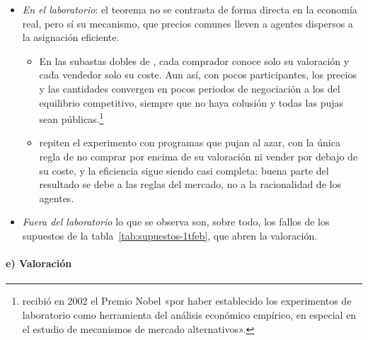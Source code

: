 \documentclass[11pt]{article}
\begin{document}
\begin{itemize}
\item \emph{En el laboratorio}: el teorema no se contrasta de forma directa en la economía real, pero sí su mecanismo, que precios comunes lleven a agentes dispersos a la asignación eficiente.
  \begin{itemize}
  \item En las subastas dobles de \textcite{Smith1962Experimental}, cada comprador conoce solo su valoración y cada vendedor solo su coste. Aun así, con pocos participantes, los precios y las cantidades convergen en pocos periodos de negociación a los del equilibrio competitivo, siempre que no haya colusión y todas las pujas sean públicas\nocite{Smith1962Experimental}.\footnote{ recibió en 2002 el Premio Nobel «por haber establecido los experimentos de laboratorio como herramienta del análisis económico empírico, en especial en el estudio de mecanismos de mercado alternativos»\nocite{Nobel2002Smith}.}
  \item \textcite{GodeSunder1993Allocative} repiten el experimento con programas que pujan al azar, con la única regla de no comprar por encima de su valoración ni vender por debajo de su coste, y la eficiencia sigue siendo casi completa: buena parte del resultado se debe a las reglas del mercado, no a la racionalidad de los agentes.
  \end{itemize}
\item \emph{Fuera del laboratorio} lo que se observa son, sobre todo, los fallos de los supuestos de la tabla~\ref{tab:supuestos-1tfeb}, que abren la valoración.
\end{itemize}

\paragraph{e) Valoración}
\end{document}
